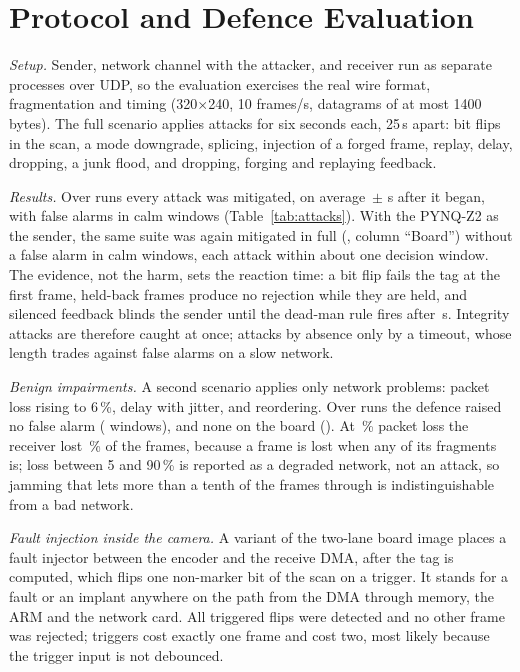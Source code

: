 \section{Protocol and Defence Evaluation}\label{sec:protocol}

\textit{Setup.} Sender, network channel with the attacker, and receiver run as separate processes over UDP, so the evaluation exercises the real wire format, fragmentation and timing (320$\times$240, 10 frames/s, datagrams of at most 1400 bytes). The full scenario applies \NumAttacks{} attacks for six seconds each, 25\,s apart: bit flips in the scan, a mode downgrade, splicing, injection of a forged frame, replay, delay, dropping, a junk flood, and dropping, forging and replaying feedback.

\textit{Results.} Over \SuiteRuns{} runs every attack was mitigated, on average \TtmMean{}\,$\pm$\,\TtmSd{}\,s after it began, with \SuiteFalse{} false alarms in calm windows (Table~\ref{tab:attacks}). With the PYNQ-Z2 as the sender, the same suite was again mitigated in full (\BdSuiteMit, column ``Board'') without a false alarm in \BdSuiteFalse{} calm windows, each attack within about one decision window. The evidence, not the harm, sets the reaction time: a bit flip fails the tag at the first frame, held-back frames produce no rejection while they are held, and silenced feedback blinds the sender until the dead-man rule fires after \FbDropTtm\,s. Integrity attacks are therefore caught at once; attacks by absence only by a timeout, whose length trades against false alarms on a slow network.

\textit{Benign impairments.} A second scenario applies only network problems: packet loss rising to 6\,\%, delay with jitter, and reordering. Over \BenignRuns{} runs the defence raised no false alarm (\BenignFalse{} windows), and none on the board (\BdBenignFalse{}). At \CaseSixPct\,\% packet loss the receiver lost \CaseSixFrameLoss\,\% of the frames, because a frame is lost when any of its fragments is; loss between 5 and 90\,\% is reported as a degraded network, not an attack, so jamming that lets more than a tenth of the frames through is indistinguishable from a bad network.

\textit{Fault injection inside the camera.} A variant of the two-lane board image places a fault injector between the encoder and the receive DMA, after the tag is computed, which flips one non-marker bit of the scan on a trigger. It stands for a fault or an implant anywhere on the path from the DMA through memory, the ARM and the network card. All \BdTamperShots{} triggered flips were detected and no other frame was rejected; \BdTamperOneFrame{} triggers cost exactly one frame and \BdTamperTwoFrames{} cost two, most likely because the trigger input is not debounced.

